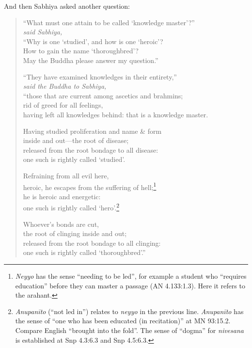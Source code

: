 \documentclass[12pt,openany]{book}%
\newcommand*{\scspeaker}[1]{\hspace{2em}\textit{#1}}
\begin{document}
And then Sabhiya asked another question: 

\begin{verse}%
“What must one attain to be called ‘knowledge master’?” \\
\scspeaker{said Sabhiya, }\\
“Why is one ‘studied’, and how is one ‘heroic’? \\
How to gain the name ‘thoroughbred’? \\
May the Buddha please answer my question.” 

“They have examined knowledges in their entirety,” \\
\scspeaker{said the Buddha to Sabhiya, }\\
“those that are current among ascetics and brahmins; \\
rid of greed for all feelings, \\
having left all knowledges behind: that is a knowledge master. 

Having studied proliferation and name \& form \\
inside and out—the root of disease; \\
released from the root bondage to all disease: \\
one such is rightly called ‘studied’. 

Refraining from all evil here, \\
heroic, he escapes from the suffering of hell;\footnote{\textit{Neyyo} has the sense “needing to be led”, for example a student who “requires education” before they can master a passage (AN 4.133:1.3). Here it refers to the arahant. } \\
he is heroic and energetic: \\
one such is rightly called ‘hero’.\footnote{\textit{\textsanskrit{Anupanīto}} (“not led in”) relates to \textit{neyyo} in the previous line. \textit{\textsanskrit{Anupanīto}} has the sense of “one who has been educated (in recitation)” at MN 93:15.2. Compare English “brought into the fold”. The sense of “dogma” for \textit{nivesana} is established at Snp 4.3:6.3 and Snp 4.5:6.3. } 

Whoever’s bonds are cut, \\
the root of clinging inside and out; \\
released from the root bondage to all clinging: \\
one such is rightly called ‘thoroughbred’.” 

%
\end{verse}
\end{document}
